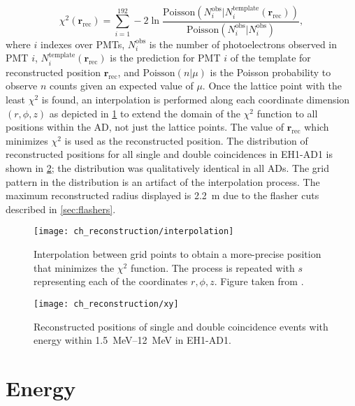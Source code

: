 \begin{equation}
    \chi^2(\textbf{r}_{\text{rec}}) = \sum_{i=1}^{192} -2\ln\frac{
        \text{Poisson}(N_i^{\text{obs}} \vert N_i^{\text{template}}(\textbf{r}_{\text{rec}}))
    }
    {
        \text{Poisson}(N_i^{\text{obs}} \vert N_i^{\text{obs}})
    },
\end{equation}
where $i$ indexes over PMTs,
$N_i^{\text{obs}}$ is the number of photoelectrons observed in PMT $i$,
$N_{i}^{\text{template}}(\textbf{r}_{\text{rec}})$ is the prediction
for PMT $i$ of the template for reconstructed position $\textbf{r}_{\text{rec}}$,
and $\text{Poisson}(n\vert\mu)$ is the Poisson probability
to observe $n$ counts given an expected value of $\mu$.
Once the lattice point with the least $\chi^2$ is found,
an interpolation is performed along each coordinate dimension $(r, \phi, z)$
as depicted in \cref{fig:interpolation}
to extend the domain of the $\chi^2$ function to all positions within the AD,
not just the lattice points.
The value of $\textbf{r}_{\text{rec}}$ which minimizes $\chi^2$
is used as the reconstructed position.
The distribution of reconstructed positions
for all single and double coincidences in EH1-AD1
is shown in \cref{fig:position_map};
the distribution was qualitatively identical in all ADs.
The grid pattern in the distribution is an artifact of the interpolation process.
The maximum reconstructed radius displayed is \SI{2.2}{\m}
due to the flasher cuts described in \cref{sec:flashers}.

\begin{figure}
    \centering
    \texttt{[image: ch\_reconstruction/interpolation]}
    \caption{
        Interpolation between grid points to obtain a more-precise position
        that minimizes the $\chi^2$ function.
        The process is repeated with $s$ representing each of the coordinates
        $r, \phi, z$.
        Figure taken from \cite{adsimple1}.
    }
    \label{fig:interpolation}
\end{figure}

\begin{figure}
    \centering
    \texttt{[image: ch\_reconstruction/xy]}
    \caption{
        Reconstructed positions of single and double coincidence events
        with energy within \SIrange{1.5}{12}{\MeV} in EH1-AD1.
    }
    \label{fig:position_map}
\end{figure}

\section{Energy}
\label{sec:reco_energy}

